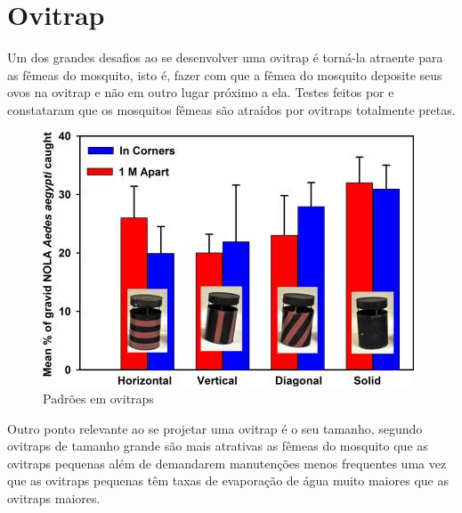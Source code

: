\documentclass[
	12pt,				%
	openright,			%
	oneside,			%
	a4paper,			%
	chapter=TITLE,		%
	english,			%
	brazil				%
	]{abntex2}
\begin{document}
\section{Ovitrap}
Um dos grandes desafios ao se desenvolver uma ovitrap é torná-la atraente para as fêmeas do mosquito, isto é, fazer com que a fêmea 
do mosquito deposite seus ovos na ovitrap 
e não em outro lugar próximo a ela. Testes feitos por \cite{DAVIDF2011} e \cite{VALERIE2016} constataram que os mosquitos fêmeas 
são atraídos por ovitraps totalmente pretas.

\begin{figure}[H]
\centering
\includegraphics[scale=0.8]{imagens/tileshop.jpeg}
\caption{Padrões em ovitraps}
\end{figure}

Outro ponto relevante ao se projetar uma ovitrap é o seu tamanho, segundo \cite{BRIANJJOHNSON2017} ovitraps de tamanho grande são 
mais atrativas as fêmeas do mosquito
 que as ovitraps pequenas além de demandarem manutenções menos frequentes uma vez que as ovitraps pequenas têm taxas de evaporação 
 de água muito maiores que as ovitraps maiores.

\newpage
\end{document}

